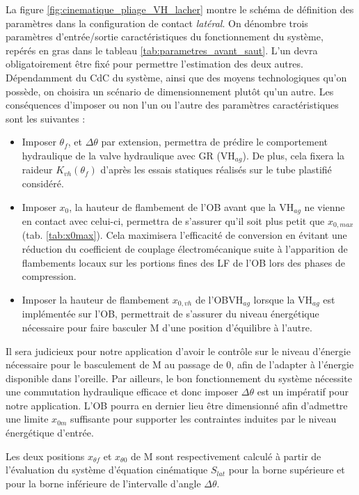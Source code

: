La figure \ref{fig:cinematique_pliage_VH_lacher} montre le schéma de définition des paramètres dans la configuration de contact \emph{latéral}. On dénombre trois paramètres d'entrée/sortie caractéristiques du fonctionnement du système, repérés en gras dans le tableau \ref{tab:parametres_avant_saut}. L'un devra obligatoirement être fixé pour permettre l'estimation des deux autres. Dépendamment du CdC du système, ainsi que des moyens technologiques qu'on possède, on choisira un scénario de dimensionnement plutôt qu'un autre. Les conséquences d'imposer ou non l'un ou l'autre des paramètres caractéristiques sont les suivantes :
\begin{itemize}[label=$\bullet$]
   \item Imposer $\theta_f$, et $\Delta\theta$ par extension, permettra de prédire le comportement hydraulique de la valve hydraulique avec GR (VH$_{ag}$). De plus, cela fixera la raideur $K_{vh}(\theta_f)$ d'après les essais statiques réalisés sur le tube plastifié considéré.
   \item Imposer $x_{0}$, la hauteur de flambement de l'OB avant que la VH$_{ag}$ ne vienne en contact avec celui-ci, permettra de s'assurer qu'il soit plus petit que $x_{0,max}$ (tab. \ref{tab:x0max}). Cela maximisera l'efficacité de conversion en évitant une réduction du coefficient de couplage électromécanique suite à l'apparition de flambements locaux sur les portions fines des LF de l'OB lors des phases de compression.
   \item Imposer la hauteur de flambement $x_{0,vh}$ de l'OBVH$_{ag}$ lorsque la VH$_{ag}$ est implémentée sur l'OB, permettrait de s'assurer du niveau énergétique nécessaire pour faire basculer M d'une position d'équilibre à l'autre.
\end{itemize}
Il sera judicieux pour notre application d'avoir le contrôle sur le niveau d'énergie nécessaire pour le basculement de M au passage de 0, afin de l'adapter à l'énergie disponible dans l'oreille. Par ailleurs, le bon fonctionnement du système nécessite une commutation hydraulique efficace et donc imposer $\Delta\theta$ est un impératif pour notre application. L'OB pourra en dernier lieu être dimensionné afin d'admettre une limite $x_{0m}$ suffisante pour supporter les contraintes induites par le niveau énergétique d'entrée.

Les deux positions $x_{\theta f}$ et $x_{\theta 0}$ de M sont respectivement calculé à partir de l'évaluation du système d'équation cinématique $S_{lat}$ pour la borne supérieure et pour la borne inférieure de l'intervalle d'angle $\Delta\theta$.

